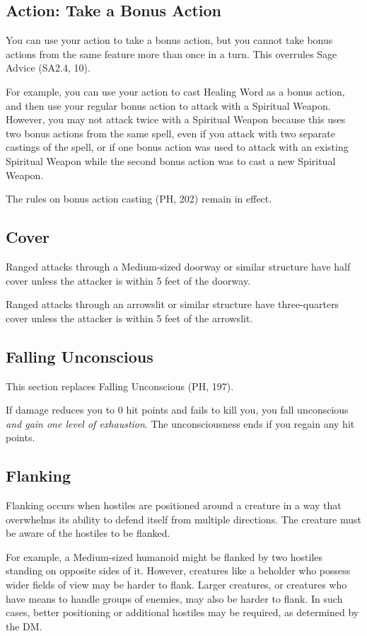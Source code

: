 \documentclass[letterpaper,twocolumn,openany,nodeprecatedcode]{dndbook}
\begin{document}
\subsection{Action: Take a Bonus Action}
\label{takeABonusAction}
You can use your action to take a bonus action, but you cannot take bonus actions from the same feature more than once in a turn. This overrules Sage Advice (SA2.4, 10).

For example, you can use your action to cast Healing Word as a bonus action, and then use your regular bonus action to attack with a Spiritual Weapon. However, you may not attack twice with a Spiritual Weapon because this uses two bonus actions from the same spell, even if you attack with two separate castings of the spell, or if one bonus action was used to attack with an existing Spiritual Weapon while the second bonus action was to cast a new Spiritual Weapon.

The rules on bonus action casting (PH, 202) remain in effect.

\subsection{Cover}
Ranged attacks through a Medium-sized doorway or similar structure have half cover unless the attacker is within 5 feet of the doorway.

Ranged attacks through an arrowslit or similar structure have three-quarters cover unless the attacker is within 5 feet of the arrowslit.

\subsection{Falling Unconscious}
This section replaces Falling Unconscious (PH, 197).

If damage reduces you to 0 hit points and fails to kill you, you fall unconscious \textit{and gain one level of exhaustion}. The unconsciousness ends if you regain any hit points.

\subsection{Flanking}
Flanking occurs when hostiles are positioned around a creature in a way that overwhelms its ability to defend itself from multiple directions. The creature must be aware of the hostiles to be flanked.

For example, a Medium-sized humanoid might be flanked by two hostiles standing on opposite sides of it. However, creatures like a beholder who possess wider fields of view may be harder to flank. Larger creatures, or creatures who have means to handle groups of enemies, may also be harder to flank. In such cases, better positioning or additional hostiles may be required, as determined by the DM.
\end{document}
